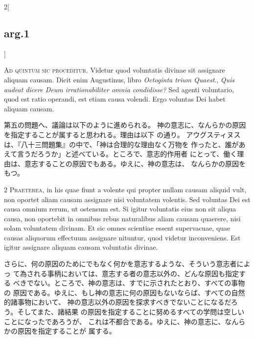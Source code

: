 \documentclass[paper=a4paper,fontsize=10pt,jafontsize=9pt,titlepage]{jlreq}
\begin{document}
\begin{paracol}{2}[\subsection{arg.1}]


{\huge A}{\scshape d quintum sic proceditur}. Videtur quod
voluntatis divinae sit assignare aliquam causam. Dicit enim Augustinus,
libro {\itshape Octoginta trium Quaest}., {\itshape Quis audeat dicere Deum irrationabiliter
omnia condidisse?} Sed agenti voluntario, quod est ratio operandi, est
etiam causa volendi. Ergo voluntas Dei habet aliquam causam.

\switchcolumn

第五の問題へ、議論は以下のように進められる。
神の意志に、なんらかの原因を指定することが属すると思われる。理由は以下
 の通り。
アウグスティヌスは、『八十三問題集』の中で、「神は合理的な理由なく万物を
 作ったと、誰があえて言うだろうか」と述べている。ところで、意志的作用者
 にとって、働く理由は、意志することの原因でもある。ゆえに、神の意志は、
 なんらかの原因をもつ。



{\scshape 2 Praeterea}, in his quae fiunt a volente qui
propter nullam causam aliquid vult, non oportet aliam causam assignare
nisi voluntatem volentis. Sed voluntas Dei est causa omnium rerum, ut
ostensum est. Si igitur voluntatis eius non sit aliqua causa, non
oportebit in omnibus rebus naturalibus aliam causam quaerere, nisi solam
voluntatem divinam. Et sic omnes scientiae essent supervacuae, quae
causas aliquorum effectuum assignare nituntur, quod videtur
inconveniens. Est igitur assignare aliquam causam voluntatis divinae.

\switchcolumn

さらに、何の原因のためにでもなく何かを意志するような、そういう意志者によっ
 て為される事柄においては、意志する者の意志以外の、どんな原因も指定する
 べきでない。ところで、神の意志は、すでに示されたとおり、すべての事物の
 原因である。ゆえに、もし神の意志に何の原因もないならば、すべての自然的諸事物において、
神の意志以外の原因を探求すべきでないことになるだろう。そしてまた、諸結果
 の原因を指定することに努めるすべての学問は空しいことになったであろうが、
 これは不都合である。ゆえに、神の意志に、なんらかの原因を指定することが
 属する。




\end{paracol}
\end{document}
